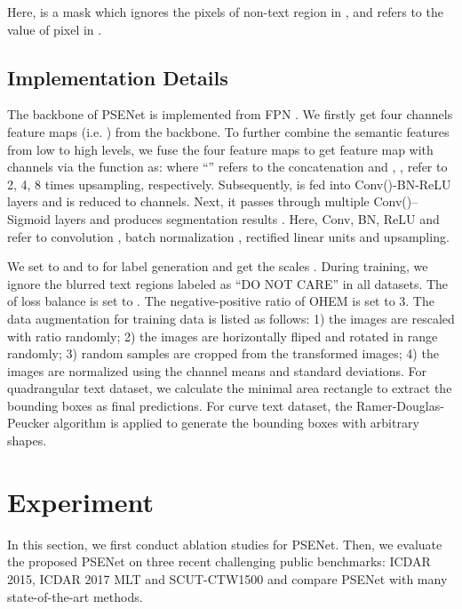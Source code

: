 \documentclass{article}
\begin{document}
Here,  is a mask which ignores the pixels of non-text region in , and  refers to the value of pixel  in .

\subsection{Implementation Details}
The backbone of PSENet is implemented from FPN \cite{lin2017feature}. We firstly get four  channels feature maps (i.e. ) from the backbone. To further combine the semantic features from low to high levels, we fuse the four feature maps to get feature map  with  channels via the function  as: 
where ``'' refers to the concatenation and , ,  refer to 2, 4, 8 times upsampling, respectively. Subsequently,  is fed into Conv()-BN-ReLU layers and is reduced to  channels. Next, it passes through multiple 
Conv()--Sigmoid layers and produces  segmentation results . Here, Conv, BN, ReLU and  refer to convolution \cite{lecun1998gradient}, batch normalization \cite{ioffe2015batch}, rectified linear units \cite{glorot2011deep} and upsampling.

We set  to  and  to  for label generation and get the scales . During training, we ignore the blurred text regions labeled as “DO NOT CARE” in all datasets. The  of loss balance is set to . The negative-positive ratio of OHEM is set to 3. The data augmentation for training data is listed as follows: 1) the images are rescaled with ratio  randomly; 2) the images are horizontally fliped and rotated in range  randomly; 3)  random samples are cropped from the transformed images; 4) the images are normalized using the channel means and standard deviations. 
For quadrangular text dataset, we calculate the minimal area rectangle to extract the bounding boxes as final predictions. For curve text dataset, the Ramer-Douglas-Peucker algorithm \cite{ramer1972iterative} is applied to generate the bounding boxes with arbitrary shapes. 












\section{Experiment}
In this section, we first conduct ablation studies for PSENet. Then, we evaluate the proposed PSENet on three recent challenging public benchmarks: ICDAR 2015, ICDAR 2017 MLT and SCUT-CTW1500 and compare PSENet with many state-of-the-art methods.
\end{document}
